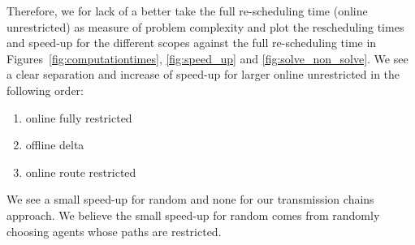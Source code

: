\documentclass{article}
\begin{document}
Therefore, we for lack of a better take the full re-scheduling time (online unrestricted) as measure of problem complexity and plot the rescheduling times and speed-up for the different scopes against the full re-scheduling time in Figures~\ref{fig:computationtimes}, \ref{fig:speed_up} and \ref{fig:solve_non_solve}.
We see a clear separation and increase of speed-up for larger online unrestricted in the following order:
\begin{enumerate}
    \item online fully restricted
    \item offline delta
    \item online route restricted
\end{enumerate}
We see a small speed-up for random and none for our transmission chains approach. We believe the small speed-up for random comes from randomly choosing agents whose paths are restricted.
\end{document}
